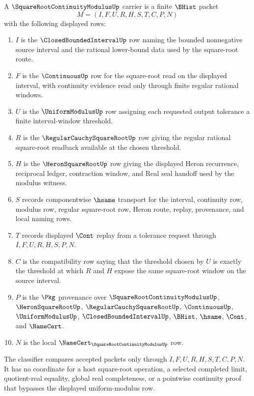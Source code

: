 \begin{definition}
\label{def:square-root-continuity-modulus-carrier}
A $\SquareRootContinuityModulusUp$ carrier is a finite $\BHist$ packet
$$
M=(I,F,U,R,H,S,T,C,P,N)
$$
with the following displayed rows:
\begin{enumerate}
\item $I$ is the $\ClosedBoundedIntervalUp$ row naming the bounded nonnegative source interval and the rational lower-bound data used by the square-root route.
\item $F$ is the $\ContinuousUp$ row for the square-root read on the displayed interval, with continuity evidence read only through finite regular rational windows.
\item $U$ is the $\UniformModulusUp$ row assigning each requested output tolerance a finite interval-window threshold.
\item $R$ is the $\RegularCauchySquareRootUp$ row giving the regular rational square-root readback available at the chosen threshold.
\item $H$ is the $\HeronSquareRootUp$ row giving the displayed Heron recurrence, reciprocal ledger, contraction window, and Real seal handoff used by the modulus witness.
\item $S$ records componentwise $\hsame$ transport for the interval, continuity row, modulus row, regular square-root row, Heron route, replay, provenance, and local naming rows.
\item $T$ records displayed $\Cont$ replay from a tolerance request through $I,F,U,R,H,S,P,N$.
\item $C$ is the compatibility row saying that the threshold chosen by $U$ is exactly the threshold at which $R$ and $H$ expose the same square-root window on the source interval.
\item $P$ is the $\Pkg$ provenance over $\SquareRootContinuityModulusUp$, $\HeronSquareRootUp$, $\RegularCauchySquareRootUp$, $\ContinuousUp$, $\UniformModulusUp$, $\ClosedBoundedIntervalUp$, $\BHist$, $\hsame$, $\Cont$, and $\NameCert$.
\item $N$ is the local $\NameCert_{\SquareRootContinuityModulusUp}$ row.
\end{enumerate}
The classifier compares accepted packets only through $I,F,U,R,H,S,T,C,P,N$. It has no coordinate for a host square-root operation, a selected completed limit, quotient-real equality, global real completeness, or a pointwise continuity proof that bypasses the displayed uniform-modulus row.
\end{definition}

